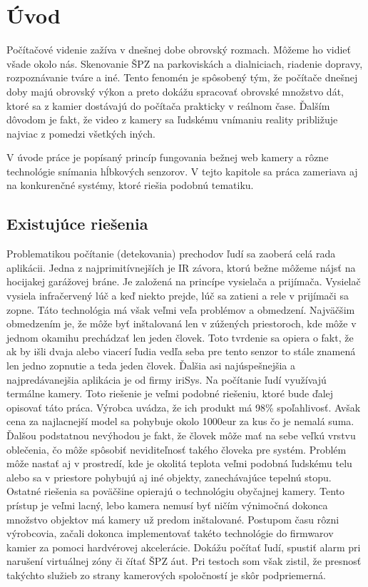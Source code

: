
\chapter{Úvod}
Počítačové videnie zažíva v dnešnej dobe obrovský rozmach. Môžeme ho vidieť všade okolo nás. Skenovanie ŠPZ na parkoviskách a dialniciach,  riadenie dopravy, rozpoznávanie tváre a iné. Tento fenomén je spôsobený tým, že počítače dnešnej doby majú obrovský výkon a preto dokážu spracovať obrovské množstvo dát, ktoré sa z kamier dostávajú do počítača prakticky v reálnom čase. Ďalším dôvodom je fakt, že video z kamery sa ľudskému vnímaniu reality približuje najviac z pomedzi všetkých iných. 
	
V úvode práce je popísaný princíp fungovania bežnej web kamery a rôzne technológie snímania hĺbkových senzorov. V tejto kapitole sa práca zameriava aj na konkurenčné systémy, ktoré riešia podobnú tematiku.

\section{Existujúce riešenia}
Problematikou počítanie (detekovania) prechodov ľudí sa zaoberá celá rada aplikácii.  
Jedna z najprimitívnejších je IR závora, ktorú bežne môžeme nájsť na hocijakej garážovej bráne. Je založená na princípe vysielača a prijímača. Vysielač vysiela infračervený lúč a keď niekto prejde, lúč sa zatieni a rele v prijímači sa zopne. Táto technológia má však veľmi veľa problémov a obmedzení. Najväčšim obmedzením je, že môže byť inštalovaná len v zúžených priestoroch, kde môže v jednom okamihu prechádzať len jeden človek. Toto tvrdenie sa opiera o fakt, že ak by išli dvaja alebo viacerí ľudia vedľa seba pre tento senzor to stále znamená len jedno zopnutie a teda jeden človek.
Ďalšia asi najúspešnejšia a najpredávanejšia aplikácia je od firmy iriSys. Na počítanie ľudí využívajú termálne kamery. Toto riešenie je veľmi podobné riešeniu, ktoré bude ďalej opisovať táto práca. Výrobca uvádza, že ich produkt má 98\% spoľahlivosť. Avšak cena za najlacnejší model sa pohybuje okolo 1000eur za kus čo je nemalá suma. Ďalšou podstatnou nevýhodou je fakt, že človek môže mať na sebe veľkú vrstvu oblečenia, čo môže spôsobiť neviditeľnosť takého človeka pre systém. Problém môže nastať aj v prostredí, kde je okolitá teplota veľmi podobná ľudskému telu alebo sa v priestore pohybujú aj iné objekty, zanechávajúce tepelnú stopu.
Ostatné riešenia sa poväčšine opierajú o technológiu obyčajnej kamery. Tento prístup je veľmi lacný, lebo kamera nemusí byť ničím výnimočná dokonca množstvo objektov má kamery už  predom inštalované. Postupom času rôzni výrobcovia, začali dokonca implementovať takéto technológie do firmwarov kamier za pomoci hardvérovej akcelerácie. Dokážu počítať ľudí, spustiť alarm pri narušení virtuálnej zóny či čítať ŠPZ áut. Pri testoch som však zistil, že presnosť takýchto služieb zo strany kamerových spoločností je skôr podpriemerná. 





